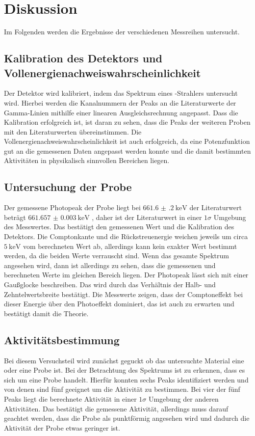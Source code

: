 \section{Diskussion}
\label{sec:Diskussion}
Im Folgenden werden die Ergebnisse der verschiedenen Messreihen untersucht.

\subsection{Kalibration des Detektors und Vollenergienachweiswahrscheinlichkeit}
Der Detektor wird kalibriert, indem das Spektrum eines -Strahlers untersucht wird.
Hierbei werden die Kanalnummern der Peaks an die Literaturwerte \cite{Gamma_lit} der Gamma-Linien mithilfe einer linearen 
Ausgleichsrechnung angepasst. Dass die Kalibration erfolgreich ist, ist daran zu sehen, dass die Peaks der weiteren
Proben mit den Literaturwerten übereinstimmen.
Die Vollenergienachweiswahrscheinlichkeit ist auch erfolgreich, da eine Potenzfunktion gut an die gemessenen Daten angepasst werden konnte und die 
damit bestimmten Aktivitäten in physikalisch sinnvollen Bereichen liegen. 

\subsection{Untersuchung der  Probe}
Der gemessene Photopeak der  Probe liegt bei $\SI{661.6(2)}{\kilo\eV}$ der Literaturwert beträgt $\SI{661.657(3)}{\kilo\eV}$ \cite{Gamma_lit},
daher ist der Literaturwert in einer $1\sigma$ Umgebung des Messwertes. Das bestätigt den gemessenen Wert und die Kalibration des 
Detektors. Die Comptonkante und die Rückstreuenergie weichen jeweils um circa $\SI{5}{\kilo\eV}$ vom berechneten Wert ab, allerdings
kann kein exakter Wert bestimmt werden, da die beiden Werte verrauscht sind. Wenn das gesamte Spektrum angesehen wird, dann ist allerdings 
zu sehen, dass die gemessenen und berechneten Werte im gleichen Bereich liegen.
Der Photopeak lässt sich mit einer Gaußglocke beschreiben. Das wird durch das Verhältnis der Halb- und Zehntelwertsbreite 
bestätigt. 
Die Messwerte zeigen, dass der Comptoneffekt bei dieser Energie über den Photoeffekt dominiert, das ist auch zu erwarten und bestätigt 
damit die Theorie.

\subsection{Aktivitätsbestimmung}
Bei diesem Versuchsteil wird zunächst geguckt ob das untersuchte Material eine  oder eine  Probe ist.
Bei der Betrachtung des Spektrums ist zu erkennen, dass es sich um eine  Probe handelt.
Hierfür konnten sechs Peaks identifiziert werden und von denen sind fünf geeignet um die Aktivität zu bestimmen.
Bei vier der fünf Peaks liegt die berechnete Aktivität in einer $1\sigma$ Umgebung der anderen Aktivitäten. 
Das bestätigt die gemessene Aktivität, allerdings muss darauf geachtet werden, dass die Probe als punktförmig angesehen wird
und dadurch die Aktivität der Probe etwas geringer ist.


